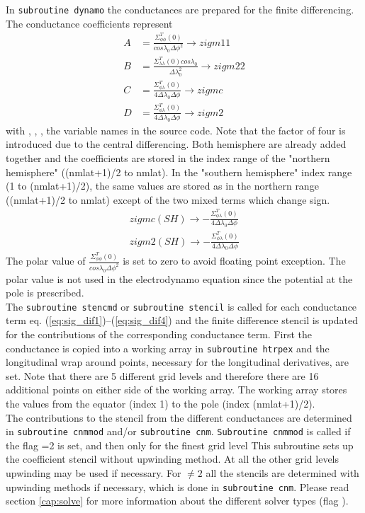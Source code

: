 %
In \texttt{subroutine dynamo} the conductances are prepared for the
finite differencing. The conductance coefficients represent 
% 
\begin{align}
A&= \frac{\Sigma_{\phi \phi}^T(0)}{cos\lambda_0  \Delta \phi^2 }	   \rightarrow  zigm11\label{eq:sig_dif1}\\
B&= \frac{\Sigma_{\lambda \lambda}^T(0) cos \lambda_0}{\Delta \lambda_0^2} \rightarrow  zigm22\label{eq:sig_dif2} \\
C&= \frac{\Sigma_{\phi \lambda}^T(0)}{4\Delta \lambda_0 \Delta \phi }    \rightarrow  zigmc \label{eq:sig_dif3} \\
D&= \frac{\Sigma_{\phi \lambda}^T(0)}{4 \Delta \lambda_0 \Delta \phi}    \rightarrow  zigm2 \label{eq:sig_dif4} 
\end{align}
%
with , , ,  the variable names in
the source code.
Note that the factor of four is introduced due to the 
central differencing. Both hemisphere are already added 
together and the coefficients are stored in the index range
of the "northern hemisphere" ((nmlat+1)/2 to nmlat).
In the "southern hemisphere" index range (1 to (nmlat+1)/2), the same values are stored as in the
northern range ((nmlat+1)/2 to nmlat) except of the two mixed terms which change
sign.
% 
\begin{align}
 zigmc(SH)  \rightarrow -\frac{\Sigma_{\phi \lambda}^T(0)}{4\Delta \lambda_0 \Delta \phi } \\
 zigm2(SH)  \rightarrow -\frac{\Sigma_{\phi \lambda}^T(0)}{4 \Delta \lambda_0 \Delta \phi} 
\end{align}
%
The polar value of $\frac{\Sigma_{\phi \phi}^T(0)}{cos\lambda_0  \Delta \phi^2 }$
is set to zero to avoid floating point exception. The polar value is
not used in the electrodynamo equation since the potential at the pole is
prescribed. \\
%
The \texttt{subroutine stencmd} or \texttt{subroutine stencil} is called
for each conductance term eq. (\ref{eq:sig_dif1})--(\ref{eq:sig_dif4}) 
and the finite difference stencil is updated for the contributions 
of the corresponding conductance term. First the conductance
is copied into a working
array in \texttt{subroutine htrpex} and the longitudinal wrap around points, 
necessary for
the longitudinal derivatives, are set. Note that there are 5 different grid
levels and therefore there are 16 additional points on either side of the
working array. The working array stores the values from the equator (index 1) to the pole
(index (nmlat+1)/2). \\
%
The contributions to the stencil from the different conductances are
determined in \texttt{subroutine cnmmod} and/or \texttt{subroutine cnm}.
\texttt{Subroutine cnmmod} is called if the flag =2 
is set, and then only for the finest grid level
This subroutine sets
up the coefficient stencil without upwinding method. At all the other grid
levels upwinding may be used if necessary. For 
 $\neq 2$ all the stencils are determined with upwinding methods
if necessary, which is done in  \texttt{subroutine cnm}.
Please read section \ref{cap:solve} for more information about the different
solver types (flag ). \\

